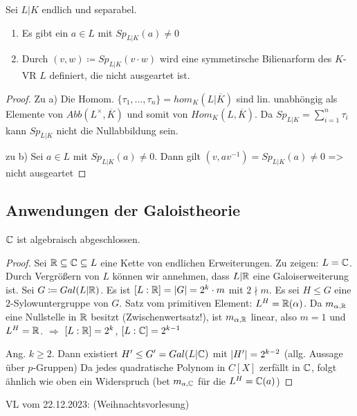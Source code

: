 \documentclass[../main.tex]{subfiles}
\begin{document}
\begin{theorem}
    Sei $L|K$ endlich und separabel.
    \begin{enumerate}%
        \item Es gibt ein $a\in L$ mit $Sp_{L|K}(a)\neq 0$
        \item Durch $(v,w)\coloneqq Sp_{L|K}(v\cdot w)$ wird eine symmetirsche Bilienarform des $K$-VR $L$ definiert, die nicht ausgeartet ist.
    \end{enumerate}
\end{theorem}
\begin{proof}
Zu a)
    Die Homom. $\{\tau_1,\dots,\tau_n\} = hom_K(L|\overline{K})$ sind lin. unabhöngig als Elemente von $Abb(L^\times,\overline{K})$ und somit  von $Hom_K(L,\overline{K})$.
    Da $Sp_{L|K} = \sum_{i=1}^n \tau_i$ kann $Sp_{L|K}$ nicht die Nullabbildung sein.

    zu b)
    Sei $a\in L$ mit $Sp_{L|K}(a)\neq 0$. Dann gilt $(v, av^{-1}) = Sp_{L|K}(a) \neq 0$ => nicht ausgeartet
\end{proof}
\subsection{Anwendungen der Galoistheorie}
\begin{reminder*}
    $\mathbb{C}$ ist algebraisch abgeschlossen.
\end{reminder*}
\begin{proof}
    Sei $\mathbb{R}\subseteq\mathbb{C}\subseteq L$ eine Kette von endlichen Erweiterungen.
    Zu zeigen: $L= \mathbb{C}$.
    Durch Vergrößern von $L$ können wir annehmen, dass $L|\mathbb{R}$ eine Galoiserweiterung ist.
    Sei $G\coloneqq Gal(L|\mathbb{R})$.
    Es ist $[L:\mathbb{R}] = \left\vert G \right\vert = 2^k\cdot m$ mit $2\nmid m$.
    Es sei $H\leq G$ eine $2$-Sylowuntergruppe von $G$.
    \TODO[Bild]
    Satz vom primitiven Element: $L^H= \mathbb{R}(\alpha)$.
    Da $m_{\alpha,\mathbb{R}}$ eine Nullstelle in $\mathbb{R}$ besitzt (Zwischenwertsatz!), ist $m_{\alpha,\mathbb{R}}$ linear, also $m=1$ und $L^H= \mathbb{R}$.
    $\Rightarrow$ $[L:\mathbb{R}] = 2^k$, $[L:\mathbb{C}] = 2^{k-1}$

    Ang. $k\geq 2$. Dann existiert $H'\leq G' = Gal(L|\mathbb{C})$ mit $\left\vert H' \right\vert = 2^{k-2}$ (allg. Aussage über $p$-Gruppen)
    \TODO[bild]
    Da jedes quadratische Polynom in $C[X]$ zerfällt in $\mathbb{C}$, folgt ähnlich wie oben ein Widerspruch (bet $m_{a,\mathbb{C}}$ für die $L^H=\mathbb{C}(a)$)
\end{proof}

\begin{flushright}
VL vom 22.12.2023: (Weihnachtsvorlesung)
\end{flushright}
\end{document}
